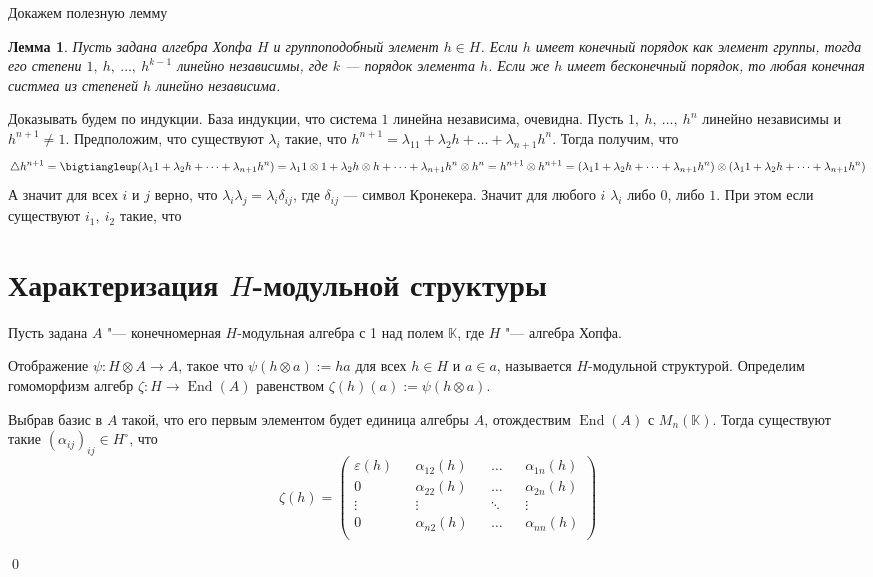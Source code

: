 \documentclass[12pt, reqno, a4paper, oneside, notitlepage]{amsart}
\makeatletter
\theoremstyle{mytheoremstyle}
\newtheorem{lemma}[theorem]{Лемма}
\theoremstyle{myremarkstyle}
\numberwithin{equation}{section}
\renewenvironment{proof}[1][\proofname]{\par\indent {\bfseries #1\@addpunct{.} }}{\qed}
\DeclareMathOperator{\End}{End}
\makeatother
\begin{document}
Докажем полезную лемму 
\begin{lemma}
  Пусть задана алгебра Хопфа $H$ и группоподобный элемент $h \in H$. Если $h$ имеет конечный порядок как элемент группы, тогда его степени $1,\ h,\ \dots,\ h^{k-1}$ линейно независимы, где $k$ --- порядок элемента $h$. Если же $h$ имеет бесконечный порядок, то любая конечная систмеа из степеней $h$ линейно независима.
\end{lemma}

\begin{proof}
  Доказывать будем по индукции.
  База индукции, что система $1$ линейна независима, очевидна.
  Пусть $1,\ h,\ \dots,\ h^n$ линейно независимы и $h^{n+1} \neq 1$. Предположим, что существуют $\lambda_i$ такие, что $h^{n+1} = \lambda_11+\lambda_2h + \dots + \lambda_{n+1}h^n$. Тогда получим, что  \[
  \bigtriangleup h^{n+1} = \bigtiangleup (\lambda_11+\lambda_2h + \dots + \lambda_{n+1}h^n) = \lambda_1 1 \otimes 1 +\lambda_2 h \otimes h + \dots + \lambda_{n+1} h^n \otimes h^n = h^{n+1} \otimes h^{n+1} =  (\lambda_11+\lambda_2h + \dots + \lambda_{n+1}h^n) \otimes (\lambda_11+\lambda_2h + \dots + \lambda_{n+1}h^n)
  \]
  А значит для всех $i$ и $j$ верно, что $\lambda_i\lambda_j = \lambda_i \delta_{ij}$, где $\delta_{ij}$ --- символ Кронекера. Значит для любого $i$ $\lambda_i$ либо $0$, либо $1$. При этом если существуют $i_1,\ i_2$ такие, что 
\newpage

\section{Характеризация \texorpdfstring{$H$}{H}-модульной структуры}

Пусть задана $A$ "--- конечномерная $H$-модульная алгебра с 1 над полем $\mathbb{K}$, где $H$ "--- алгебра Хопфа.

Отображение $\psi: H \otimes A \to A$, такое что $\psi(h \otimes a) := ha$ для всех $h \in H$ и $a \in a$, называется $H$-модульной структурой. Определим гомоморфизм алгебр $\zeta: H \to \End(A)$ равенством $\zeta(h)(a) := \psi (h \otimes a)$.

Выбрав базис в $A$ такой, что его первым элементом будет единица алгебры $A$, отождествим $\End(A)$ с $M_n(\mathbb{K})$.
Тогда существуют такие $(\alpha_{ij})_{ij} \in H^\circ$, что \[\zeta(h) = 
\begin{pmatrix}
    \varepsilon(h) && \alpha_{12}(h) && \dots  && \alpha_{1n}(h)\\
    0    && \alpha_{22}(h) && \dots  && \alpha_{2n}(h)\\
    \vdots    &&  \vdots       && \ddots  && \vdots       \\
    0    && \alpha_{n2}(h) && \dots  && \alpha_{nn}(h)\\
\end{pmatrix}
\]


\end{proof}
\end{document}
